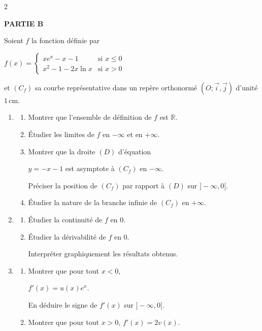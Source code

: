 \documentclass[12pt,a4paper]{article}
\begin{document}
\begin{multicols}{2}
\begin{enumerate}
\end{enumerate}

\textbf{PARTIE B}

Soient \( f \) la fonction définie par

\(
f(x)=
\begin{cases}
xe^x-x-1 & \text{si } x\le 0 \\
x^2-1-2x\ln x & \text{si } x>0
\end{cases}
\)

et \( (C_f) \) sa courbe représentative dans un repère orthonormé \( (O;\vec{i},\vec{j}) \) d’unité \( 1\,\text{cm} \).

\begin{enumerate}

\item
\begin{enumerate}
\item Montrer que l’ensemble de définition de \( f \) est \( \mathbb{R} \).
\item Étudier les limites de \( f \) en \( -\infty \) et en \( +\infty \).
\item Montrer que la droite \( (D) \) d’équation 

\( y=-x-1 \) est asymptote à \( (C_f) \) en \( -\infty \).

Préciser la position de \( (C_f) \) par rapport à \( (D) \) sur \( ]-\infty,0[ \).

\item Étudier la nature de la branche infinie de \( (C_f) \) en \( +\infty \).
\end{enumerate}

\item
\begin{enumerate}
\item Étudier la continuité de \( f \) en \( 0 \).
\item Étudier la dérivabilité de \( f \) en \( 0 \).

Interpréter graphiquement les résultats obtenus.
\end{enumerate}

\item
\begin{enumerate}
\item Montrer que pour tout \( x<0 \),

 \( f'(x)=u(x)e^x \).

En déduire le signe de \( f'(x) \) sur \( ]-\infty,0[ \).

\item Montrer que pour tout \( x>0 \), \( f'(x)=2v(x) \).


\end{enumerate}
\end{enumerate}
\end{multicols}
\end{document}

